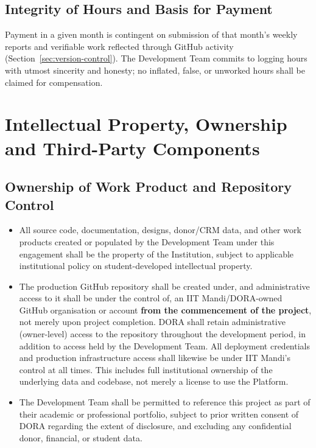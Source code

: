 \documentclass[11pt]{article}
\begin{document}
\subsection{Integrity of Hours and Basis for Payment}
Payment in a given month is contingent on submission of that month's weekly reports and verifiable work reflected through GitHub activity (Section~\ref{sec:version-control}). The Development Team commits to logging hours with utmost sincerity and honesty; no inflated, false, or unworked hours shall be claimed for compensation.

\section{Intellectual Property, Ownership and Third-Party Components}
\label{sec:ip}

\subsection{Ownership of Work Product and Repository Control}
\begin{itemize}[leftmargin=1.4em, itemsep=3pt]
\item All source code, documentation, designs, donor/CRM data, and other work products created or populated by the Development Team under this engagement shall be the property of the Institution, subject to applicable institutional policy on student-developed intellectual property.
\item The production GitHub repository shall be created under, and administrative access to it shall be under the control of, an IIT Mandi/DORA-owned GitHub organisation or account \textbf{from the commencement of the project}, not merely upon project completion. DORA shall retain administrative (owner-level) access to the repository throughout the development period, in addition to access held by the Development Team. All deployment credentials and production infrastructure access shall likewise be under IIT Mandi's control at all times. This includes full institutional ownership of the underlying data and codebase, not merely a license to use the Platform.
\item The Development Team shall be permitted to reference this project as part of their academic or professional portfolio, subject to prior written consent of DORA regarding the extent of disclosure, and excluding any confidential donor, financial, or student data.
\end{itemize}
\end{document}
